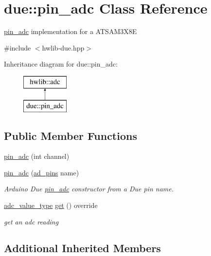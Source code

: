 \hypertarget{classdue_1_1pin__adc}{}\section{due\+:\+:pin\+\_\+adc Class Reference}
\label{classdue_1_1pin__adc}


\hyperlink{classdue_1_1pin__adc}{pin\+\_\+adc} implementation for a A\+T\+S\+A\+M3\+X8E  




{\ttfamily \#include $<$hwlib-\/due.\+hpp$>$}

Inheritance diagram for due\+:\+:pin\+\_\+adc\+:\begin{figure}[H]
\begin{center}
\leavevmode
\includegraphics[height=2.000000cm]{classdue_1_1pin__adc}
\end{center}
\end{figure}
\subsection*{Public Member Functions}
\begin{DoxyCompactItemize}
\item 
\hyperlink{classdue_1_1pin__adc_a3b84a29f1ff159f40361ed969a1c8dd2}{pin\+\_\+adc} (int channel)
\item 
\hyperlink{classdue_1_1pin__adc_a106bc97a20bb90be8cc0d8d9152d201f}{pin\+\_\+adc} (\hyperlink{namespacedue_a5ecc98d40585c91eabbfb14f71bd7d4c}{ad\+\_\+pins} name)
\begin{DoxyCompactList}\small\item\em Arduino Due \hyperlink{classdue_1_1pin__adc}{pin\+\_\+adc} constructor from a Due pin name. \end{DoxyCompactList}\item 
\hyperlink{classhwlib_1_1adc_a7ce65f485597a481a518a4b84073605f}{adc\+\_\+value\+\_\+type} \hyperlink{classdue_1_1pin__adc_a024c090f8d9f0de7a3414d1d3dfe33d9}{get} () override
\begin{DoxyCompactList}\small\item\em get an adc reading \end{DoxyCompactList}\end{DoxyCompactItemize}
\subsection*{Additional Inherited Members}


